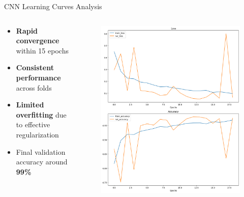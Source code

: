 \documentclass[aspectratio=169,8pt]{beamer}  %
\begin{document}
\begin{frame}{CNN Learning Curves Analysis}
\begin{columns}[T]
\begin{column}{0.5\textwidth}
\begin{itemize}
\item \textbf{Rapid convergence} within 15 epochs
\item \textbf{Consistent performance} across folds
\item \textbf{Limited overfitting} due to effective regularization
\item Final validation accuracy around \textbf{99\%}
\end{itemize}
\end{column}
\begin{column}{0.5\textwidth}
\begin{figure}
\includegraphics[width=\textwidth, height=0.9\textwidth]{imgs/cnn_train.png}
\end{figure}
\end{column}
\end{columns}
\end{frame}
\end{document}
